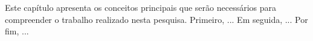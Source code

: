 Este capítulo apresenta os conceitos principais que serão necessários para compreender o trabalho realizado nesta pesquisa. 
Primeiro, ... 
Em seguida, ... 
Por fim, ... 



